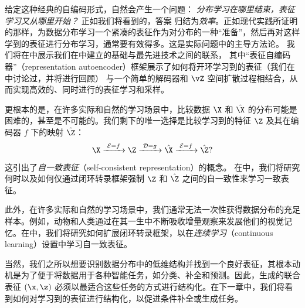 \documentclass[../../book-main_zh.tex]{subfiles}
\begin{document}
给定这种经典的自编码形式，自然会产生一个问题：
\textit{分布学习在哪里结束，表征学习又从哪里开始？}
正如我们将看到的，答案 %
归结为\textit{效率}。正如现代实践所证明的那样，为数据分布学习一个紧凑的表征作为对分布的一种“准备”，然后再对这样学到的表征进行分布学习，通常要有效得多。这是实际问题中的主导方法论。
我们将在中展示我们在中建立的基础与最先进技术之间的联系，
其中“表征自编码器”（representation autoencoder）框架展示了如何将开环学习到的表征（我们在中讨论过，并将进行回顾）
与一个简单的解码器和 $\vZ$ 空间扩散过程相结合，从而实现高效的、同时进行的表征学习和采样。

更根本的是，在许多实际和自然的学习场景中，比较数据 $\X$ 和 $\hat \X$ 的分布可能是困难的，甚至是不可能的。我们剩下的唯一选择是比较学习到的特征 $\Z$ 及其在编码器 $f$ 下的映射 $\hat \Z$：
\begin{equation}
    \X
    \xrightarrow{\hspace{1mm} \mathcal{E} = f \hspace{1mm}} \Z
    \xrightarrow{\hspace{1mm} \mathcal{D} = g \hspace{1mm}} \hat{\X}
    \xrightarrow{\hspace{1mm} \mathcal{E} = f \hspace{1mm}} \hat \Z?
\end{equation}
这引出了{\em 自一致表征}（self-consistent representation）的概念。
在中，我们将研究何时以及如何仅通过闭环转录框架强制 $\Z$ 和 $\hat \Z$ 之间的自一致性来学习一致表征。

此外，在许多实际和自然的学习场景中，我们通常无法一次性获得数据分布的充足样本。例如，动物和人类通过在其一生中不断吸收增量观察来发展他们的视觉记忆。在中，我们将研究如何扩展闭环转录框架，以在{\em 连续学习}（continuous learning）设置中学习自一致表征。

当然，我们之所以想要识别数据分布中的低维结构并找到一个良好表征，其根本动机是为了便于将数据用于各种智能任务，如分类、补全和预测。因此，生成的联合表征 $(\x, \z)$ 必须以最适合这些任务的方式进行结构化。在下一章中，我们将看到如何对学习到的表征进行结构化，以促进条件补全或生成任务。
\end{document}
